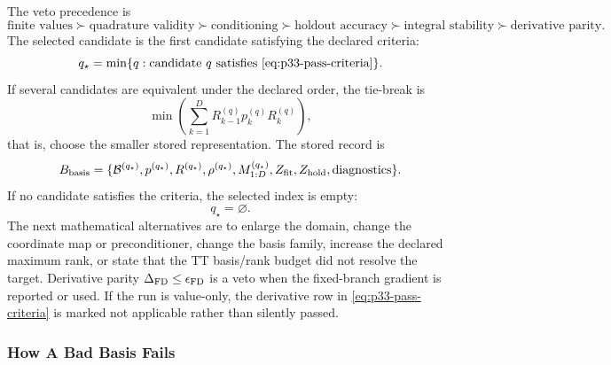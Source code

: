 \documentclass[11pt]{article}
\numberwithin{equation}{section}
\begin{document}
The veto precedence is
\begin{equation}
    \text{finite values}
    \succ \text{quadrature validity}
    \succ \text{conditioning}
    \succ \text{holdout accuracy}
    \succ \text{integral stability}
    \succ \text{derivative parity}.
    \label{eq:p33-veto-order}
\end{equation}
The selected candidate is the first candidate satisfying the declared criteria:
\begin{equation}
    q_\star=\min\{q:\text{candidate }q\text{ satisfies \eqref{eq:p33-pass-criteria}}\}.
    \label{eq:p33-selected-candidate}
\end{equation}
If several candidates are equivalent under the declared order, the tie-break is
\begin{equation}
    \min
    \left(
    \sum_{k=1}^D R_{k-1}^{(q)}p_k^{(q)}R_k^{(q)}
    \right),
    \label{eq:p33-tie-break}
\end{equation}
that is, choose the smaller stored representation.  The stored record is
\begin{equation}
    B_{\rm basis}
    =
    \{\mathcal B^{(q_\star)},p^{(q_\star)},R^{(q_\star)},\rho^{(q_\star)},
      M_{1:D}^{(q_\star)},Z_{\rm fit},Z_{\rm hold},\text{diagnostics}\}.
    \label{eq:p33-basis-record}
\end{equation}
If no candidate satisfies the criteria, the selected index is empty:
\begin{equation}
    q_\star=\varnothing.
    \label{eq:p33-no-candidate}
\end{equation}
The next mathematical alternatives are to enlarge the domain, change the
coordinate map or preconditioner, change the basis family, increase the
declared maximum rank, or state that the TT basis/rank budget did not resolve
the target.  Derivative
parity \(\Delta_{\rm FD}\le\epsilon_{\rm FD}\) is a veto when the fixed-branch
gradient is reported or used.  If the run is value-only, the derivative row in
\eqref{eq:p33-pass-criteria} is marked not applicable rather than silently
passed.

\subsubsection{How A Bad Basis Fails}
\end{document}
